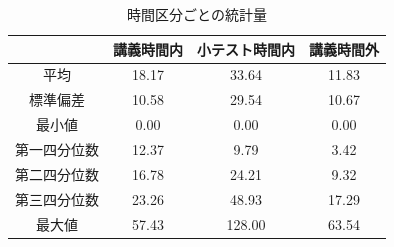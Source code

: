 \documentclass[a4paper,12pt]{ltjsreport}
\begin{document}
\begin{table}[tbp]
  \centering
  \caption{時間区分ごとの統計量}
  \label{tb:sousakaisuu}
  \begin{tabular}{c|c|c|c}
    & 講義時間内 & 小テスト時間内 & 講義時間外 \\ \hline\hline
    平均 & 18.17 & 33.64 & 11.83 \\ \hline
    標準偏差 & 10.58 & 29.54 & 10.67 \\ \hline
    最小値 & 0.00 & 0.00 & 0.00 \\ \hline
    第一四分位数 & 12.37 & 9.79 & 3.42 \\ \hline
    第二四分位数 & 16.78 & 24.21 & 9.32 \\ \hline
    第三四分位数 & 23.26 & 48.93 & 17.29 \\ \hline
    最大値 & 57.43 & 128.00 & 63.54 \\ \hline
  \end{tabular}
\end{table}

\end{document}
